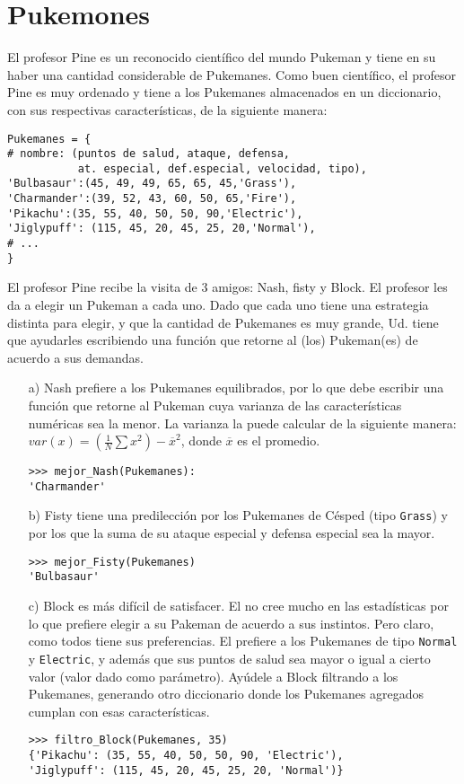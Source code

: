 \section{Pukemones}

El profesor Pine es un reconocido científico
del mundo Pukeman y tiene en su haber
una cantidad considerable de Pukemanes.
Como buen científico,
el profesor Pine es muy ordenado
y tiene a los Pukemanes almacenados
en un diccionario,
con sus respectivas características,
de la siguiente manera:

\begin{lstlisting}[style = consola]
Pukemanes = {
# nombre: (puntos de salud, ataque, defensa,
           at. especial, def.especial, velocidad, tipo),
'Bulbasaur':(45, 49, 49, 65, 65, 45,'Grass'),
'Charmander':(39, 52, 43, 60, 50, 65,'Fire'),
'Pikachu':(35, 55, 40, 50, 50, 90,'Electric'),
'Jiglypuff': (115, 45, 20, 45, 25, 20,'Normal'),
# ...
}
\end{lstlisting}

El profesor Pine recibe la visita de 3 amigos:
Nash, fisty y Block.
El profesor les da a elegir
un Pukeman a cada uno.
Dado que cada uno tiene una estrategia distinta
para elegir,
y que la cantidad de Pukemanes es muy grande,
Ud. tiene que ayudarles escribiendo
una función que retorne al
(los) Pukeman(es) de acuerdo a sus demandas.

\begin{itemize}
\item[a)]
Nash prefiere a los Pukemanes equilibrados,
por lo que debe escribir una función
que retorne al Pukeman cuya varianza de las características
numéricas sea la menor.
La varianza la puede calcular de la siguiente manera:
\(var(x) = \left( \frac{1}{N} \sum x^2 \right) - \overline{x}^2\),
donde \(\overline{x}\) es el promedio.

\begin{lstlisting}[style = consola]
>>> mejor_Nash(Pukemanes):
'Charmander'
\end{lstlisting}
\item[b)]
Fisty tiene una predilección por los
Pukemanes de Césped
(tipo \texttt{Grass})
y por los que la suma de su ataque especial
y defensa especial sea la mayor.

\begin{lstlisting}[style = consola]
>>> mejor_Fisty(Pukemanes)
'Bulbasaur'
\end{lstlisting}
\item[c)]
Block es más difícil de satisfacer.
El no cree mucho en las estadísticas
por lo que prefiere elegir a su Pakeman
de acuerdo a sus instintos.
Pero claro,
como todos tiene sus preferencias.
El prefiere a los Pukemanes de tipo
\texttt{Normal} y \texttt{Electric},
y además que sus puntos de salud sea
mayor o igual a cierto valor
(valor dado como parámetro).
Ayúdele a Block filtrando a los Pukemanes,
generando otro diccionario donde los Pukemanes
agregados cumplan con esas características.

\begin{lstlisting}[style=consola]
>>> filtro_Block(Pukemanes, 35)
{'Pikachu': (35, 55, 40, 50, 50, 90, 'Electric'),
'Jiglypuff': (115, 45, 20, 45, 25, 20, 'Normal')}
\end{lstlisting}
\end{itemize}
